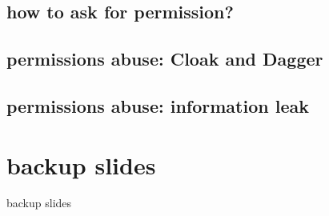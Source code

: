 \subsection{how to ask for permission?}


\subsection{permissions abuse: Cloak and Dagger}


\subsection{permissions abuse: information leak}








\section{backup slides}
\begin{frame}{backup slides}
\end{frame}


